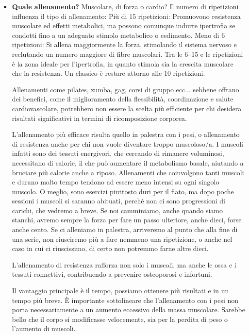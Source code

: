 \documentclass[12pt]{book} %
\begin{document}
\begin{itemize}
\item \textbf{Quale allenamento?}
Muscolare, di forza o cardio?
Il numero di ripetizioni influenza il tipo di allenamento:
Più di 15 ripetizioni: Promuovono resistenza muscolare ed effetti metabolici, ma possono comunque indurre ipertrofia se condotti fino a un adeguato stimolo metabolico o cedimento.
Meno di 6 ripetizioni: Si allena maggiormente la forza, stimolando il sistema nervoso e reclutando un numero maggiore di fibre muscolari.
Tra le 6–15 e le ripetizioni è la zona ideale per l'ipertrofia, in quanto stimola sia la crescita muscolare che la resistenza. Un classico è restare attorno alle 10 ripetizioni.

Allenamenti come pilates, zumba, gag,  corsi di gruppo ecc... sebbene offrano dei benefici, come il miglioramento della flessibilità, coordinazione e salute cardiovascolare, potrebbero non essere la scelta più efficiente per chi desidera risultati significativi in termini di ricomposizione corporea.

L'allenamento più efficace risulta quello in palestra con i pesi, o allenamento di resistenza anche per chi non vuole diventare troppo muscoloso/a.
I muscoli infatti sono dei tessuti energivori, che cercando di rimanere voluminosi, necessitano di calorie, il che può aumentare il metabolismo basale, aiutando a bruciare più calorie anche a riposo.
Allenamenti che coinvolgono tanti muscoli e durano molto tempo tendono ad essere meno intensi su ogni singolo muscolo. O meglio, sono esercizi piuttosto duri per il fiato, ma dopo poche sessioni i muscoli si saranno abituati, perché non ci sono progressioni di carichi, che vedremo a breve. Se noi camminiamo, anche quando siamo stanchi, avremo sempre la forza per fare un passo ulteriore, anche dieci, forse anche cento. Se ci alleniamo in palestra, arriveremo al punto che alla fine di una serie, non riusciremo più a fare nemmeno una ripetizione, o anche nel caso in cui ci riuscissimo, di certo non potremmo farne altre dieci.

L'allenamento di resistenza rafforza non solo i muscoli, ma anche le ossa e i tessuti connettivi, contribuendo a prevenire osteoporosi e infortuni. 

Il vantaggio principale è il tempo, possiamo ottenere più risultati e in un tempo più breve. È importante sottolineare che l'allenamento con i pesi non porta necessariamente a un aumento eccessivo della massa muscolare. Sarebbe bello che il corpo si modificasse velocemente, sia per la perdita di peso o l'aumento di muscoli.


\end{itemize}
\end{document}
